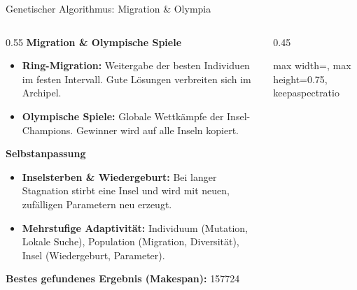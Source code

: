 \documentclass[aspectratio=169]{beamer}
\begin{document}
\begin{frame}{Genetischer Algorithmus: Migration \& Olympia}
\begin{columns}[c]
\footnotesize
\begin{column}{0.55\textwidth}
\textbf{Migration \& Olympische Spiele}
\begin{itemize}
    \item \textbf{Ring-Migration:} Weitergabe der besten Individuen im festen Intervall. Gute Lösungen verbreiten sich im Archipel.
    \item \textbf{Olympische Spiele:} Globale Wettkämpfe der Insel-Champions. Gewinner wird auf alle Inseln kopiert.
\end{itemize}
\textbf{Selbstanpassung}
\begin{itemize}
    \item \textbf{Inselsterben \& Wiedergeburt:} Bei langer Stagnation stirbt eine Insel und wird mit neuen, zufälligen Parametern neu erzeugt.
    \item \textbf{Mehrstufige Adaptivität:} Individuum (Mutation, Lokale Suche), Population (Migration, Diversität), Insel (Wiedergeburt, Parameter).
\end{itemize}

\vspace{0cm}
\textcolor{HFTTeal}{\scriptsize \textbf{Bestes gefundenes Ergebnis (Makespan):} 157724}
\end{column}

\begin{column}{0.45\textwidth}
\begin{center}
\begin{adjustbox}{max width=\textwidth, max height=0.75\paperheight, keepaspectratio}
\end{adjustbox}
\end{center}
\end{column}
\end{columns}
\end{frame}
\end{document}
